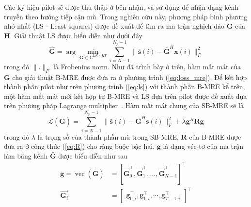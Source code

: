 Các ký hiệu pilot sẽ được thu thập ở bên nhận, và sử dụng để nhận dạng kênh truyền theo hướng tiếp cận mù. Trong nghiên cứu này, phương pháp bình phương nhỏ nhất (LS - Least squares) được đề xuất để tìm ra ma trận nghịch đảo $\bar{\mathbf{G}}$ của $\mathbf{H}$. Giải thuật LS được biểu diễn như dưới đây
\begin{equation}
\label{eq:ls}
    \hat{\mathbf{G}} = \arg \underset{\bar{\mathbf{G}} \in \mathbb{C}^{LN \times KT}}{\min} \sum_{i=N-1}^{N_{p} - 1}\|\bar{\mathbf{s}}(i)- \bar{\mathbf{G}}^H \mathbf{x}(i)\|_F^2 
\end{equation}
trong đó $\lVert . \rVert _F$ là Frobenius norm. Như đã trình bày ở trên, hàm mất mát của $\bar{\mathbf{G}}$ cho giải thuật B-MRE được đưa ra ở phương trình (\ref{eq:loss_mre}). Để kết hợp thành phần pilot như trên phương trình (\ref{eq:ls}) với thành phần B-MRE kể trên, một hàm mất mát mới kết hợp tự B-MRE và LS dựa trên pilot được đề xuất dựa trên phương pháp Lagrange multiplier~\cite{bertsekas2014constrained}. Hàm mất mát chung của SB-MRE sẽ là
\begin{equation}
\label{eq:cost}
    \mathcal{L}(\bar{\mathbf{G}})=\sum_{i=N-1}^{N_{p} - 1}\|\bar{\mathbf{s}}(i)- \bar{\mathbf{G}}^H \mathbf{s}(i)\|_F^2 +\lambda \mathbf{g}^H \mathbf{R} \mathbf{g}
\end{equation}
trong đó $\lambda$ là trọng số của thành phần mù trong SB-MRE, $\mathbf{R}$ của B-MRE được đưa ra ở công thức (\ref{eq:R}) cho ràng buộc bậc hai. $\mathbf{g}$ là dạng véc-tơ của ma trận làm bằng kênh $\bar{\mathbf{G}}$ được biểu diễn như sau
\begin{equation}
\label{eq:vecG}
    \begin{aligned}
        \mathbf{g} = \operatorname{vec}(\bar{\mathbf{G}}) &=\left[\vec{\mathbf{G}}_0^\top, \vec{\mathbf{G}}_1^\top, \ldots, \vec{\mathbf{G}}_{K-1}^\top\right]^\top \\
        \vec{\mathbf{G}_i} &= \left[\begin{array}{ll}
        \mathbf{g}_{0, i}^\top, \mathbf{g}_{1, i}^\top, \cdots, \mathbf{g}_{T-1, i}^\top
        \end{array}\right]^\top
    \end{aligned}
\end{equation}

